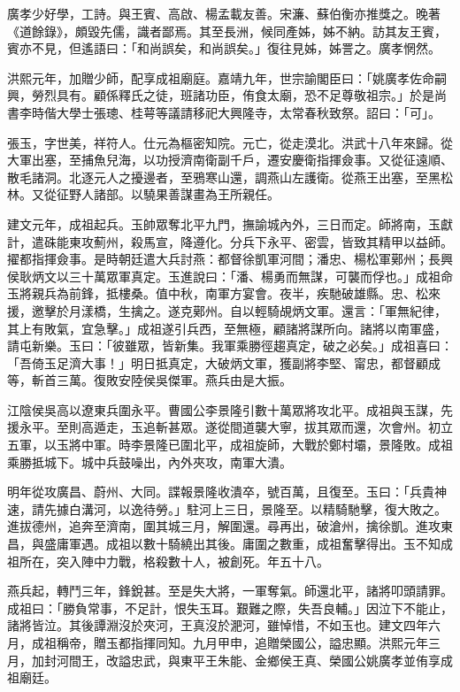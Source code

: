 \begin{pinyinscope}
廣孝少好學，工詩。與王賓、高啟、楊孟載友善。宋濂、蘇伯衡亦推獎之。晚著《道餘錄》，頗毀先儒，識者鄙焉。其至長洲，候同產姊，姊不納。訪其友王賓，賓亦不見，但遙語曰：「和尚誤矣，和尚誤矣。」復往見姊，姊詈之。廣孝惘然。

洪熙元年，加贈少師，配享成祖廟庭。嘉靖九年，世宗諭閣臣曰：「姚廣孝佐命嗣興，勞烈具有。顧係釋氏之徒，班諸功臣，侑食太廟，恐不足尊敬祖宗。」於是尚書李時偕大學士張璁、桂萼等議請移祀大興隆寺，太常春秋致祭。詔曰：「可」。

張玉，字世美，祥符人。仕元為樞密知院。元亡，從走漠北。洪武十八年來歸。從大軍出塞，至捕魚兒海，以功授濟南衛副千戶，遷安慶衛指揮僉事。又從征遠順、散毛諸洞。北逐元人之擾邊者，至鴉寒山還，調燕山左護衛。從燕王出塞，至黑松林。又從征野人諸部。以驍果善謀畫為王所親任。

建文元年，成祖起兵。玉帥眾奪北平九門，撫諭城內外，三日而定。師將南，玉獻計，遣硃能東攻薊州，殺馬宣，降遵化。分兵下永平、密雲，皆致其精甲以益師。擢都指揮僉事。是時朝廷遣大兵討燕：都督徐凱軍河間；潘忠、楊松軍鄚州；長興侯耿炳文以三十萬眾軍真定。玉進說曰：「潘、楊勇而無謀，可襲而俘也。」成祖命玉將親兵為前鋒，抵樓桑。值中秋，南軍方宴會。夜半，疾馳破雄縣。忠、松來援，邀擊於月漾橋，生擒之。遂克鄚州。自以輕騎覘炳文軍。還言：「軍無紀律，其上有敗氣，宜急擊。」成祖遂引兵西，至無極，顧諸將謀所向。諸將以南軍盛，請屯新樂。玉曰：「彼雖眾，皆新集。我軍乘勝徑趨真定，破之必矣。」成祖喜曰：「吾倚玉足濟大事！」明日抵真定，大破炳文軍，獲副將李堅、甯忠，都督顧成等，斬首三萬。復敗安陸侯吳傑軍。燕兵由是大振。

江陰侯吳高以遼東兵圍永平。曹國公李景隆引數十萬眾將攻北平。成祖與玉謀，先援永平。至則高遁走，玉追斬甚眾。遂從間道襲大寧，拔其眾而還，次會州。初立五軍，以玉將中軍。時李景隆已圍北平，成祖旋師，大戰於鄭村壩，景隆敗。成祖乘勝抵城下。城中兵鼓噪出，內外夾攻，南軍大潰。

明年從攻廣昌、蔚州、大同。諜報景隆收潰卒，號百萬，且復至。玉曰：「兵貴神速，請先據白溝河，以逸待勞。」駐河上三日，景隆至。以精騎馳擊，復大敗之。進拔德州，追奔至濟南，圍其城三月，解圍還。尋再出，破滄州，擒徐凱。進攻東昌，與盛庸軍遇。成祖以數十騎繞出其後。庸圍之數重，成祖奮擊得出。玉不知成祖所在，突入陣中力戰，格殺數十人，被創死。年五十八。

燕兵起，轉鬥三年，鋒銳甚。至是失大將，一軍奪氣。師還北平，諸將叩頭請罪。成祖曰：「勝負常事，不足計，恨失玉耳。艱難之際，失吾良輔。」因泣下不能止，諸將皆泣。其後譚淵沒於夾河，王真沒於淝河，雖悼惜，不如玉也。建文四年六月，成祖稱帝，贈玉都指揮同知。九月甲申，追贈榮國公，謚忠顯。洪熙元年三月，加封河間王，改謚忠武，與東平王朱能、金鄉侯王真、榮國公姚廣孝並侑享成祖廟廷。


\end{pinyinscope}
